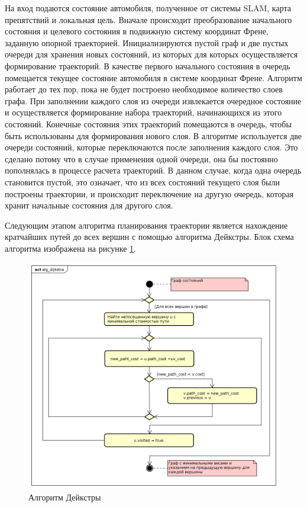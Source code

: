 На вход подаются состояние автомобиля, полученное от системы SLAM, карта препятствий и локальная цель. Вначале
происходит преобразование начального состояния и целевого состояния в подвижную систему координат Френе, заданную
опорной траекторией. Инициализируются пустой граф и две пустых очереди для хранения новых состояний, из которых
для которых осуществляется формирование траекторий. В качестве первого начального состояния в очередь помещается
текущее состояние автомобиля в системе координат Френе. Алгоритм работает до тех пор, пока не будет построено
необходимое количество слоев графа. При заполнении каждого слоя из очереди извлекается очередное состояние и
осуществляется формирование набора траекторий, начинающихся из этого состояний. Конечные состояния этих траекторий
помещаются в очередь, чтобы быть использованы для формирования нового слоя. В алгоритме используется две очереди
состояний, которые переключаются после заполнения каждого слоя. Это сделано потому что в случае применения одной очереди,
она бы постоянно пополнялась в процессе расчета траекторий. В данном случае, когда одна очередь становится пустой, это
означает, что из всех состояний текущего слоя были построены траектории, и происходит переключение на другую очередь,
которая хранит начальные состояния для другого слоя.

Следующим этапом алгоритма планирования траектории является нахождение кратчайших путей до всех вершин с помощью
алгоритма Дейкстры. Блок схема алгоритма изображена на рисунке \ref{img:alg_dijkstra}.

\begin{figure}[h]
      \centering
      \includegraphics[width=\linewidth]{images/2_project/quintic_2/alg_dijkstra}
      \caption{Алгоритм Дейкстры}
      \label{img:alg_dijkstra}
\end{figure}

